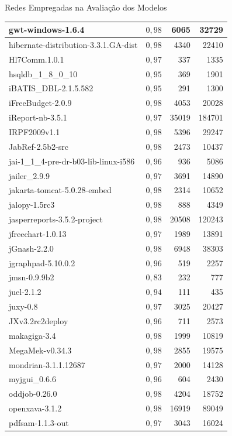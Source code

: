 \begin{chapter}{Redes Empregadas na Avaliação dos Modelos}
\begin{center}
\begin{longtable}{| p{10cm} | c | r | r |}
	gwt-windows-1.6.4 &  $0,98$ & 6065 & 32729 \\ \hline
	hibernate-distribution-3.3.1.GA-dist &  $0,98$ & 4340 & 22410 \\ \hline
	Hl7Comm.1.0.1 &  $0,97$ & 337 & 1335 \\ \hline
	hsqldb\_1\_8\_0\_10 &  $0,95$ & 369 & 1901 \\ \hline
	iBATIS\_DBL-2.1.5.582 &  $0,95$ & 291 & 1300 \\ \hline
	iFreeBudget-2.0.9 &  $0,98$ & 4053 & 20028 \\ \hline
	iReport-nb-3.5.1 &  $0,97$ & 35019 & 184701 \\ \hline
	IRPF2009v1.1 &  $0,98$ & 5396 & 29247 \\ \hline
	JabRef-2.5b2-src &  $0,98$ & 2473 & 10437 \\ \hline
	jai-1\_1\_4-pre-dr-b03-lib-linux-i586 &  $0,96$ & 936 & 5086 \\ \hline
	jailer\_2.9.9 &  $0,97$ & 3691 & 14890 \\ \hline
	jakarta-tomcat-5.0.28-embed &  $0,98$ & 2314 & 10652 \\ \hline
	jalopy-1.5rc3 &  $0,98$ & 888 & 4349 \\ \hline
	jasperreports-3.5.2-project &  $0,98$ & 20508 & 120243 \\ \hline
	jfreechart-1.0.13 &  $0,97$ & 1989 & 13891 \\ \hline
	jGnash-2.2.0 &  $0,98$ & 6948 & 38303 \\ \hline
	jgraphpad-5.10.0.2 &  $0,96$ & 519 & 2257 \\ \hline
	jmsn-0.9.9b2 &  $0,83$ & 232 & 777 \\ \hline
	juel-2.1.2 &  $0,94$ & 111 & 435 \\ \hline
	juxy-0.8 &  $0,97$ & 3025 & 20427 \\ \hline
	JXv3.2rc2deploy &  $0,96$ & 711 & 2573 \\ \hline
	makagiga-3.4 &  $0,98$ & 1999 & 10819 \\ \hline
	MegaMek-v0.34.3 &  $0,98$ & 2855 & 19575 \\ \hline
	mondrian-3.1.1.12687 &  $0,97$ & 2000 & 14128 \\ \hline
	myjgui\_0.6.6 &  $0,96$ & 604 & 2430 \\ \hline
	oddjob-0.26.0 &  $0,98$ & 4204 & 18752 \\ \hline
	openxava-3.1.2 &  $0,98$ & 16919 & 89049 \\ \hline
	pdfsam-1.1.3-out &  $0,97$ & 3043 & 16024 \\ \hline

\end{longtable}
\end{center}
\end{chapter}
